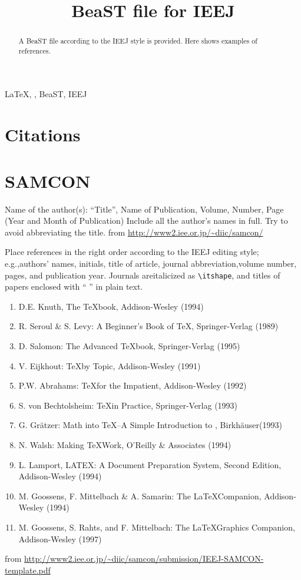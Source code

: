 \documentclass[english,letter]{ieej-e}
\title{BeaST file for IEEJ}
\begin{document}
\begin{abstract}
A BeaST file according to the IEEJ style is provided.
Here shows examples of references.
\end{abstract}
\begin{keyword}
  \LaTeX, , BeaST, IEEJ
\end{keyword}
\maketitle


\section*{Citations}
\Cite{Denki2001,Knuth1994,Yamada2001}


\section{SAMCON}
Name of the author(s): ``Title'', Name of Publication, Volume, Number, Page (Year and Month of Publication)
Include all the author's names in full.
Try to avoid abbreviating the title.
from \url{http://www2.iee.or.jp/~diic/samcon/}

Place references in the right order according to the IEEJ editing style; e.g.,authors' names, initials, title of article, journal abbreviation,volume number, pages, and publication year.
Journals areitalicized as \texttt{\textbackslash itshape}, and titles of papers enclosed with `` '' in plain text.
\footnotesize
\begin{enumerate}
  \item D.E. Knuth, The \TeX{}book, Addison-Wesley (1994)
  \item R. Seroul \& S. Levy: A Beginner's Book of \TeX, Springer-Verlag (1989)
  \item D. Salomon: The Advanced \TeX{}book, Springer-Verlag (1995)
  \item V. Eijkhout: \TeX by Topic, Addison-Wesley (1991)
  \item P.W. Abrahams: \TeX for the Impatient, Addison-Wesley (1992)
  \item S. von Bechtolsheim: \TeX in Practice, Springer-Verlag (1993)
  \item G. Gr\"atzer: Math into \TeX–A Simple Introduction to , Birkh\"auser(1993)
  \item N. Walsh: Making \TeX Work, O'Reilly \& Associates (1994)
  \item L. Lamport, LATEX:  A Document Preparation System, Second Edition, Addison-Wesley (1994)
  \item M. Goossens, F. Mittelbach \& A. Samarin: The \LaTeX Companion, Addison-Wesley (1994)
  \item M. Goossens, S. Rahts, and F. Mittelbach: The \LaTeX Graphics Companion, Addison-Wesley (1997)
\end{enumerate}
\normalsize
from \url{http://www2.iee.or.jp/~diic/samcon/submission/IEEJ-SAMCON-template.pdf}
\end{document}
